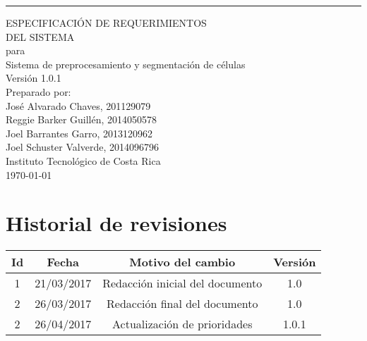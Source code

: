 \documentclass{scrreprt}
\date{}
\def\myversion{1.0.1}
\begin{document}
\begin{flushright}
	\rule{16cm}{0.2cm}\vskip1cm
    \begin{bfseries}
        \Huge{ESPECIFICACIÓN DE REQUERIMIENTOS\\DEL SISTEMA}\\
        \vspace{0.5cm}
        para\\
        \vspace{0.5cm}
        Sistema de preprocesamiento y segmentación de células\\
        \vspace{1.0cm}
        \LARGE{Versión \myversion}\\
        \vspace{1.0cm}
        Preparado por:\\ \vspace{0.5cm}
        	José Alvarado Chaves, 201129079\\
            Reggie Barker Guillén, 2014050578\\
            Joel Barrantes Garro, 2013120962\\
            Joel Schuster Valverde, 2014096796\\                        
        \vspace{1.5cm}
        Instituto Tecnológico de Costa Rica\\
        \vspace{1.5cm}
        \today\\
    \end{bfseries}
\end{flushright}


\tableofcontents


\chapter*{Historial de revisiones}

\begin{center}
    \begin{tabular}{|c|c|c|c|}
        \hline
	    Id & Fecha & Motivo del cambio & Versión\\
        \hline
	    1 & 21/03/2017 & Redacción inicial del documento & 1.0\\
        \hline        
        2 & 26/03/2017 & Redacción final del documento & 1.0\\
        \hline
        2 & 26/04/2017 & Actualización de prioridades & 1.0.1\\
        \hline
    \end{tabular}
\end{center}
\end{document}
